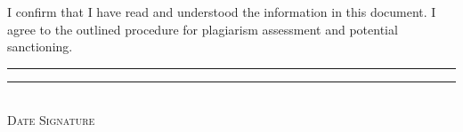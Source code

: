 {{{		I confirm that I have read and understood the information in this document. I agree to the outlined procedure for plagiarism assessment and potential sanctioning.
		}

		\vspace{2cm}
		\rule{4cm}{0.1pt} \hfill \rule{7cm}{0.1pt} \\
		\hspace*{1.75cm} \textsc{Date} \hspace*{6.8cm} \textsc{Signature}
	}
}
